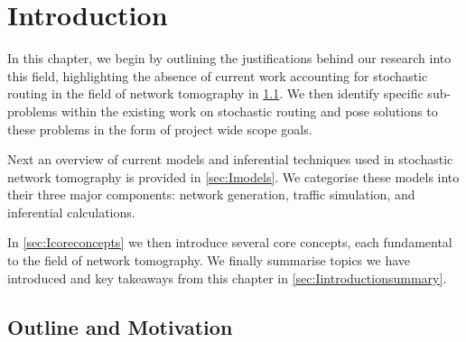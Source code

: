 \chapter{Introduction}
\label{cha:intro}
In this chapter, we begin by outlining the justifications behind our research into this field, highlighting the absence of current work accounting for stochastic routing in the field of network tomography in \cref{sec:Imotivationandoutline}. We then identify specific sub-problems within the existing work on stochastic routing and pose solutions to these problems
in the form of project wide scope goals.\par
Next an overview of current models and inferential techniques used in stochastic network tomography is provided in \cref{sec:Imodels}. We categorise these models into their three major components: network generation, traffic simulation, and inferential calculations.\par
In \cref{sec:Icoreconcepts} we then introduce several core concepts, each fundamental to the field of network tomography. We finally summarise topics we have introduced and key takeaways from this chapter in \cref{sec:Iintroductionsummary}.\par

\section{Outline and Motivation}
\label{sec:Imotivationandoutline}

